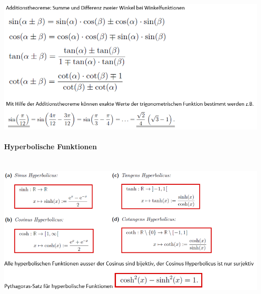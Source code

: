 \includegraphics[width=\columnwidth]{./images/trigo_circle3.png}
\vspace{1mm}

\paragraph{Hyperbolische Funktionen}\mbox{}\\
\noindent
\includegraphics[width=\columnwidth]{./images/hyper.png}
\vspace{1mm}

